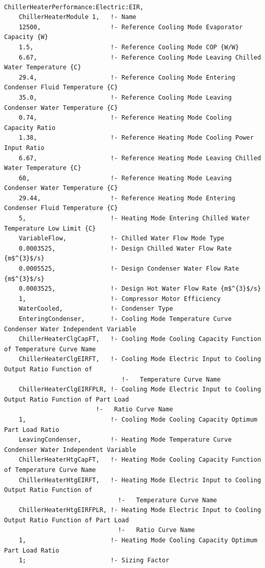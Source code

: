 \begin{lstlisting}

ChillerHeaterPerformance:Electric:EIR,
    ChillerHeaterModule 1,   !- Name
    12500,                   !- Reference Cooling Mode Evaporator Capacity {W}
    1.5,                     !- Reference Cooling Mode COP {W/W}
    6.67,                    !- Reference Cooling Mode Leaving Chilled Water Temperature {C}
    29.4,                    !- Reference Cooling Mode Entering Condenser Fluid Temperature {C}
    35.0,                    !- Reference Cooling Mode Leaving Condenser Water Temperature {C}
    0.74,                    !- Reference Heating Mode Cooling Capacity Ratio
    1.38,                    !- Reference Heating Mode Cooling Power Input Ratio
    6.67,                    !- Reference Heating Mode Leaving Chilled Water Temperature {C}
    60,                      !- Reference Heating Mode Leaving Condenser Water Temperature {C}
    29.44,                   !- Reference Heating Mode Entering Condenser Fluid Temperature {C}
    5,                       !- Heating Mode Entering Chilled Water Temperature Low Limit {C}
    VariableFlow,            !- Chilled Water Flow Mode Type
    0.0003525,               !- Design Chilled Water Flow Rate {m$^{3}$/s}
    0.0005525,               !- Design Condenser Water Flow Rate {m$^{3}$/s}
    0.0003525,               !- Design Hot Water Flow Rate {m$^{3}$/s}
    1,                       !- Compressor Motor Efficiency
    WaterCooled,             !- Condenser Type
    EnteringCondenser,       !- Cooling Mode Temperature Curve Condenser Water Independent Variable
    ChillerHeaterClgCapFT,   !- Cooling Mode Cooling Capacity Function of Temperature Curve Name
    ChillerHeaterClgEIRFT,   !- Cooling Mode Electric Input to Cooling Output Ratio Function of
                                !-   Temperature Curve Name
    ChillerHeaterClgEIRFPLR, !- Cooling Mode Electric Input to Cooling Output Ratio Function of Part Load
                         !-   Ratio Curve Name
    1,                       !- Cooling Mode Cooling Capacity Optimum Part Load Ratio
    LeavingCondenser,        !- Heating Mode Temperature Curve Condenser Water Independent Variable
    ChillerHeaterHtgCapFT,   !- Heating Mode Cooling Capacity Function of Temperature Curve Name
    ChillerHeaterHtgEIRFT,   !- Heating Mode Electric Input to Cooling Output Ratio Function of
                               !-   Temperature Curve Name
    ChillerHeaterHtgEIRFPLR, !- Heating Mode Electric Input to Cooling Output Ratio Function of Part Load
                               !-   Ratio Curve Name
    1,                       !- Heating Mode Cooling Capacity Optimum Part Load Ratio
    1;                       !- Sizing Factor
\end{lstlisting}

